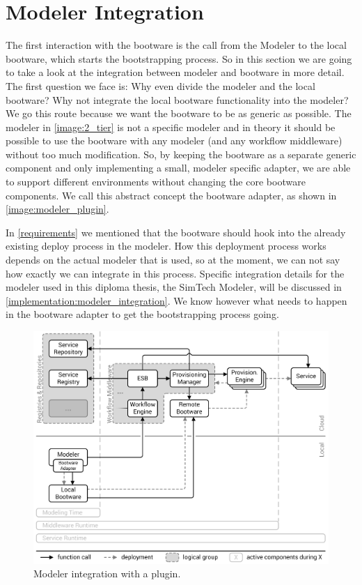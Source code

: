\section{Modeler Integration}
\label{design:modeler_integration}

The first interaction with the bootware is the call from the Modeler to the local bootware, which starts the bootstrapping process.
So in this section we are going to take a look at the integration between modeler and bootware in more detail.
The first question we face is: Why even divide the modeler and the local bootware?
Why not integrate the local bootware functionality into the modeler?
We go this route because we want the bootware to be as generic as possible.
The modeler in \autoref{image:2_tier} is not a specific modeler and in theory it should be possible to use the bootware with any modeler (and any workflow middleware) without too much modification.
So, by keeping the bootware as a separate generic component and only implementing a small, modeler specific adapter, we are able to support different environments without changing the core bootware components.
We call this abstract concept the bootware adapter, as shown in \autoref{image:modeler_plugin}.

In \autoref{requirements} we mentioned that the bootware should hook into the already existing deploy process in the modeler.
How this deployment process works depends on the actual modeler that is used, so at the moment, we can not say how exactly we can integrate in this process.
Specific integration details for the modeler used in this diploma thesis, the SimTech Modeler, will be discussed in \autoref{implementation:modeler_integration}.
We know however what needs to happen in the bootware adapter to get the bootstrapping process going.

\begin{figure}[!htbp]
	\centering
	\includegraphics[resolution=600]{design/assets/modeler_plugin}
	\caption{Modeler integration with a plugin.}
	\label{image:modeler_plugin}
\end{figure}

